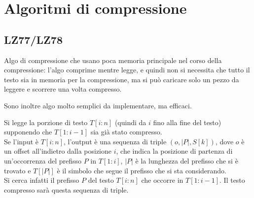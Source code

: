 \chapter{Algoritmi di compressione}
\section{LZ77/LZ78}
Algo di compressione che usano poca memoria principale nel corso della compressione:
l'algo comprime mentre legge, e quindi non si necessita che tutto il testo
sia in memoria per la compressione, ma si può caricare solo un pezzo
da leggere e scorrere una volta compresso.

Sono inoltre algo molto semplici da implementare, ma efficaci.

Si legge la porzione di testo $T[i:n]$ (quindi da $i$ fino alla fine del testo)
supponendo che $T[1:i-1]$ sia già stato compresso.\\
Se l'input è $T[i:n]$, l'output è una sequenza di triple $(o, |P|, S[k])$,
dove $o$ è un offset all'indietro dalla posizione $i$, che indica
la posizione di partenza di un'occorrenza del prefisso $P$ in $T[1:i]$,
$|P|$ è la lunghezza del prefisso che si è trovato e
$T[|P|]$ è il simbolo che segue il prefisso che si sta considerando. \\
Si cerca infatti il prefisso $P$ del testo $T[i:n]$ che occorre in $T[1:i-1]$.
Il testo compresso sarà questa sequenza di triple.

